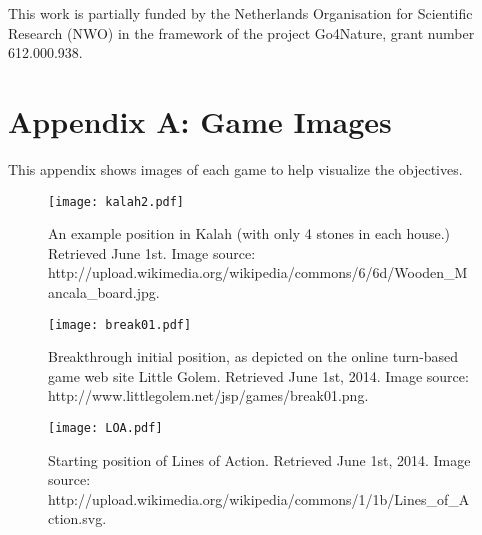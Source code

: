 \documentclass{article}
\begin{document}
{\small
{} This work is partially funded by the Netherlands 
Organisation for Scientific Research (NWO) in the framework of the project Go4Nature, grant number 612.000.938. 
}

%
%




\vspace{20cm}

\appendix

\section{Appendix A: Game Images}
\label{app:images}

This appendix shows images of each game to help visualize the objectives.


\begin{figure}[h!]
\begin{center}
\texttt{[image: kalah2.pdf]}
\end{center}
\caption{An example position in Kalah (with only 4 stones in each house.) 
Retrieved June 1st.
Image source: http://upload.wikimedia.org/wikipedia/commons/6/6d/Wooden\_Mancala\_board.jpg. \label{fig:kalah-image}}
\end{figure}

\begin{figure}[h!]
\begin{center}
\texttt{[image: break01.pdf]}
\end{center}
\caption{Breakthrough initial position, as depicted on the online turn-based game web site Little Golem. 
Retrieved June 1st, 2014. 
Image source: http://www.littlegolem.net/jsp/games/break01.png. 
\label{fig:bt-image}}
\end{figure}

\begin{figure}[h!]
\begin{center}
\texttt{[image: LOA.pdf]}
\end{center}
\caption{Starting position of Lines of Action. 
Retrieved June 1st, 2014. 
Image source: http://upload.wikimedia.org/wikipedia/commons/1/1b/Lines\_of\_Action.svg. 
\label{fig:loa-image}}
\end{figure}
\end{document}
